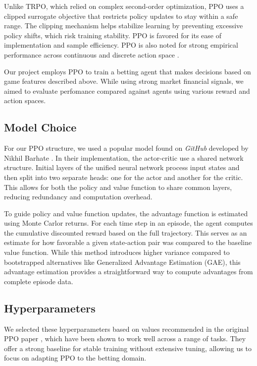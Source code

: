 \documentclass[sigconf]{acmart}
\begin{document}
Unlike TRPO, which relied on complex second-order optimization, PPO uses a clipped surrogate objective that restricts policy updates to stay within a safe range. The clipping mechanism helps stabilize learning by preventing excessive policy shifts, which risk training stability. PPO is favored for its ease of implementation and sample efficiency. PPO is also noted for strong empirical performance across continuous and discrete action space \cite{schulman2017proximalpolicyoptimizationalgorithms}.

Our project employs PPO to train a betting agent that makes decisions based on game features described above. While using strong market financial signals, we aimed to evaluate perfomance compared against agents using various reward and action spaces.

\subsection{Model Choice}

   For our PPO structure, we used a popular model found on \textit{GitHub} developed by Nikhil Barhate \cite{barhate2020ppo}. In their implementation, the actor-critic use a shared network structure. Initial layers of the unified neural network process input states and then split into two separate heads: one for the actor and another for the critic. This allows for both the policy and value function to share common layers, reducing redundancy and computation overhead.

   To guide policy and value function updates, the advantage function is estimated using Monte Carlor returns. For each time step in an episode, the agent computes the cumulative discounted reward based on the full trajectory. This serves as an estimate for how favorable a given state-action pair was compared to the baseline value function. While this method introduces higher variance compared to bootstrapped alternatives like Generalized Advantage Estimation (GAE), this advantage estimation provides a straightforward way to compute advantages from complete episode data. 

\subsection{Hyperparameters}

We selected these hyperparameters based on values recommended in the original PPO paper \cite{schulman2017proximalpolicyoptimizationalgorithms}, which have been shown to work well across a range of tasks. They offer a strong baseline for stable training without extensive tuning, allowing us to focus on adapting PPO to the betting domain.
\end{document}
